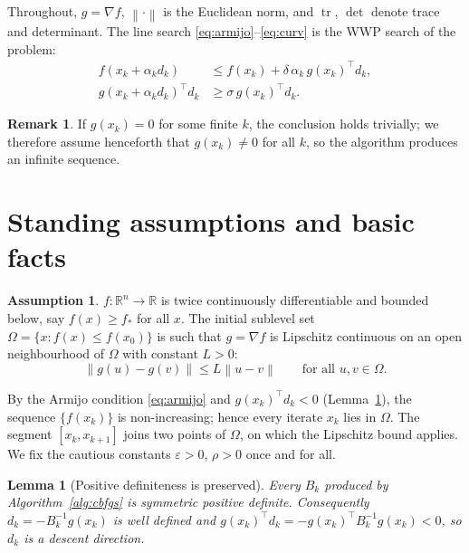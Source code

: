 \documentclass{amsart}
\newtheorem{lemma}{Lemma}
\theoremstyle{definition}
\newtheorem{assumption}{Assumption}
\newtheorem{remark}{Remark}
\DeclareMathOperator{\tr}{tr}
\newcommand{\R}{\mathbb{R}}
\newcommand{\norm}[1]{\left\lVert #1\right\rVert}
\begin{document}
Throughout, $g=\nabla f$, $\norm{\cdot}$ is the Euclidean norm, and $\tr$,
$\det$ denote trace and determinant. The line search
\eqref{eq:armijo}--\eqref{eq:curv} is the WWP search of the problem:
\begin{align}
   f(x_k+\alpha_k d_k) &\le f(x_k)+\delta\,\alpha_k\, g(x_k)^\top d_k, \label{eq:armijo}\\
   g(x_k+\alpha_k d_k)^\top d_k &\ge \sigma\, g(x_k)^\top d_k. \label{eq:curv}
\end{align}

\begin{remark}
If $g(x_k)=0$ for some finite $k$, the conclusion holds trivially; we therefore
assume henceforth that $g(x_k)\neq0$ for all $k$, so the algorithm produces an
infinite sequence.
\end{remark}

\section{Standing assumptions and basic facts}

\begin{assumption}\label{ass:f}
$f\colon\R^n\to\R$ is twice continuously differentiable and bounded below, say
$f(x)\ge f_*$ for all $x$. The initial sublevel set
$\Omega=\{x : f(x)\le f(x_0)\}$ is such that $g=\nabla f$ is Lipschitz
continuous on an open neighbourhood of $\Omega$ with constant $L>0$:
\[
   \norm{g(u)-g(v)}\le L\norm{u-v}\qquad\text{for all }u,v\in\Omega .
\]
\end{assumption}

By the Armijo condition \eqref{eq:armijo} and $g(x_k)^\top d_k<0$
(Lemma~\ref{lem:spd}), the sequence $\{f(x_k)\}$ is non-increasing; hence every
iterate $x_k$ lies in $\Omega$. The segment $[x_k,x_{k+1}]$ joins two points of
$\Omega$, on which the Lipschitz bound applies. We fix the cautious constants
$\varepsilon>0$, $\rho>0$ once and for all.

\begin{lemma}[Positive definiteness is preserved]\label{lem:spd}
Every $B_k$ produced by Algorithm~\ref{alg:cbfgs} is symmetric positive
definite. Consequently $d_k=-B_k^{-1}g(x_k)$ is well defined and
$g(x_k)^\top d_k=-g(x_k)^\top B_k^{-1}g(x_k)<0$, so $d_k$ is a descent
direction.
\end{lemma}
\end{document}
